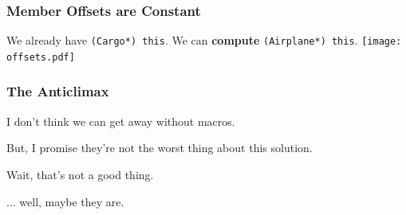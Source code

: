 \documentclass{beamer}
\def\code#1{\texttt{#1}}
\newcommand{\nl}{\vspace{0.2\baselineskip}}
\begin{document}
\begin{frame}[fragile]
\frametitle{Member Offsets are Constant}
\begin{center}
  We already have \code{(Cargo*) this}. We can \textbf{compute}
  \code{(Airplane*) this}.
  \texttt{[image: offsets.pdf]}
\end{center}

\end{frame}


\begin{frame}
  \frametitle{The Anticlimax}
\begin{center}
  I don't think we can get away without macros. \nl \nl \pause

  But, I promise they're not the worst thing about this solution. \nl \nl \pause

  Wait, that's not a good thing. \nl \nl \pause

  ... well, maybe they are.
\end{center}
\end{frame}
\end{document}
